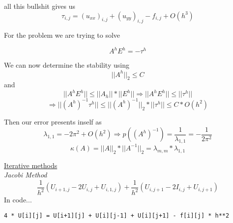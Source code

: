 \documentclass[10pt]{article}
\newcommand{\1}{\mathbb{1}}
\begin{document}
all this bullshit gives us
\[\tau_{i,j} = (u_{xx})_{i,j} + (u_{yy})_{i,j} - f_{i,j} + O(h^3)\]

For the problem we are trying to solve

\[A^h E^h = -\tau^h\]

We can now determine the stability using
\[||A^h||_2 \leq C\]
and
\[||A^hE^h|| \leq ||A_h||* ||E^h|| \Rightarrow ||A^hE^h|| \leq ||\tau^h||\]
\[\Rightarrow ||(A^h)^{-1} \tau^h|| \leq ||(A^h)^{-1}||_2 * ||\tau^h|| \leq C * O(h^2)\]

Then our error presents inself as
\[\lambda_{1,1} = -2\pi^2 + O(h^2) \Rightarrow p((A^h)^{-1}) = \frac{1}{\lambda_{1,1}} = -\frac{1}{2\pi^2}\]
\[\kappa(A) = ||A||_2 * ||A^{-1}||_2 = \lambda_{m,m} * \lambda_{1,1} \]

\underline{Iterative methods}\\

\textit{Jacobi Method}\\
\[\frac{1}{h^2}(U_{i+1, j} -2U_{i,j} + U_{i,1,j}) + \frac{1}{h^2}(U_{i, j+ 1} -2I_{i,j} + U_{i,j+1})\]
In code...
\begin{verbatim}
4 * U[i][j] = U[i+1][j] + U[i][j-1] + U[i][j+1] - f[i][j] * h**2
\end{verbatim}
\noindent \underline{\hspace{3in}}\\
\end{document}
